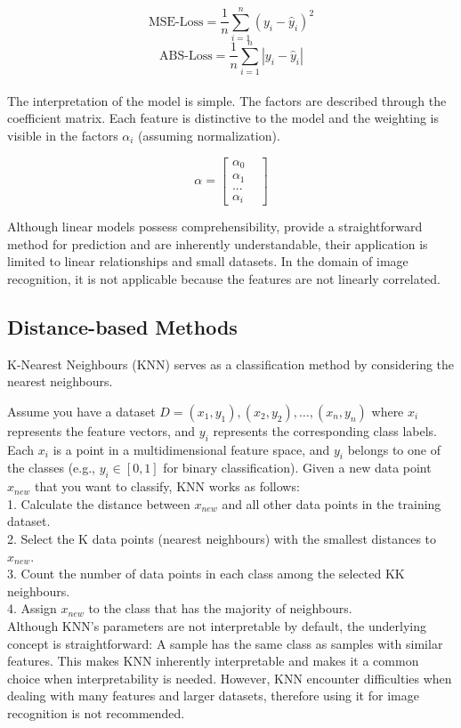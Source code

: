 $$ \text{MSE-Loss} = \frac{1}{n} \sum_{i=1}^{n} (y_i - \hat{y}_i)^2$$
$$ \text{ABS-Loss} = \frac{1}{n} \sum_{i=1}^{n} |y_i - \hat{y}_i|$$
\\
The interpretation of the model is simple. The factors are described through the coefficient matrix. Each feature is distinctive to the model and the weighting is visible in the factors $\alpha_{i}$ (assuming normalization).

$$ \alpha = \begin{bmatrix}
	\alpha_0 & \\
	\alpha_1 & \\
	... & \\
	\alpha_i &
\end{bmatrix}
$$

Although linear models possess comprehensibility, provide a straightforward method for prediction and are inherently understandable, their application is limited to linear relationships and small datasets. In the domain of image recognition, it is not applicable because the features are not linearly correlated.

\subsection{Distance-based Methods}
\label{KNN}
K-Nearest Neighbours (KNN)\cite{Mucherino2009} serves as a classification method by considering the nearest neighbours. 


Assume you have a dataset $D={(x_1,y_1),(x_2,y_2),…,(x_n,y_n)}$ where $x_i$ represents the feature vectors, and $y_i$ represents the corresponding class labels. Each $x_i$ is a point in a multidimensional feature space, and $y_i$ belongs to one of the classes (e.g., $y_i \in [0,1]$ for binary classification). 
Given a new data point $x_{new}$ that you want to classify, KNN works as follows:\\

1. Calculate the distance between $x_{new}$ and all other data points in the training dataset.\\
2. Select the K data points (nearest neighbours) with the smallest distances to $x_{new}$.\\
3. Count the number of data points in each class among the selected KK neighbours.\\
4. Assign $x_{new}$ to the class that has the majority of neighbours.\\

Although KNN's parameters are not interpretable by default, the underlying concept is straightforward: A sample has the same class as samples with similar features. This makes KNN inherently interpretable and makes it a common choice when interpretability is needed. However, KNN encounter difficulties when dealing with many features and larger datasets, therefore using it for image recognition is not recommended.

